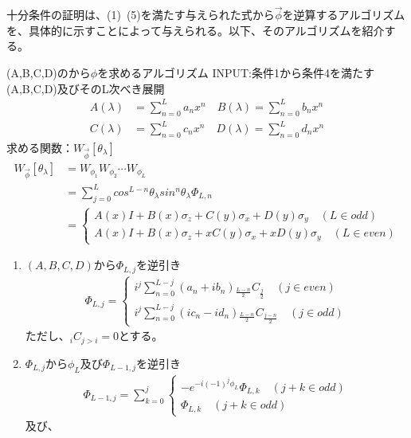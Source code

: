 \documentclass[a4paper,10.5pt]{article}
\numberwithin{equation}{section}
\begin{document}
十分条件の証明は、(1)~(5)を満たす与えられた式から$\vec{\phi}$を逆算するアルゴリズムを、具体的に示すことによって与えられる。以下、そのアルゴリズムを紹介する。
\begin{setupbox}{(A,B,C,D)のから$\phi$を求めるアルゴリズム}
INPUT:条件1から条件4を満たす(A,B,C,D)及びそのL次べき展開
\begin{align*}
    A(\lambda)&=\sum_{n=0}^{L}a_{n}x^{n}\quad
    B(\lambda)=\sum_{n=0}^{L}b_{n}x^{n}\\
    C(\lambda)&=\sum_{n=0}^{L}c_{n}x^{n} \quad
    D(\lambda)=\sum_{n=0}^{L}d_{n}x^{n}
\end{align*}
求める関数：$W_{\vec{\phi}}[\theta_{\lambda}]$
\begin{align*}
        W_{\vec{\phi}}[\theta_{\lambda}]
        &=W_{\phi_{1}}W_{\phi_{2}}\cdots W_{\phi_{L}}\\
        &=\sum_{j=0}^{L}cos^{L-n}\theta_{\lambda}sin^{n}\theta_{\lambda}\Phi_{L,n}\\
        &=\begin{cases}
            A(x)I+B(x)\sigma_{z}+C(y)\sigma_{x}+D(y)\sigma_{y}\quad(L\in odd)\\
            A(x)I+B(x)\sigma_{z}+xC(y)\sigma_{x}+xD(y)\sigma_{y}\quad (L\in even)
        \end{cases}
    \end{align*}
\begin{enumerate}
    \item $(A,B,C,D)$から$\Phi_{L,j}$を逆引き
        \begin{align*}
        \Phi_{L,j}=
        \begin{cases}
            i^{j}\sum_{n=0}^{L-j}(a_{n}+ib_{n}){}_{\frac{L-n}{2}}C_{\frac{j}{2}}\quad (j\in even)\\
            i^{j}\sum_{n=0}^{L-j}(ic_{n}-id_{n}){}_{\frac{L-n}{2}}C_{\frac{j-n}{2}}\quad (j\in odd)
        \end{cases}
        \end{align*}
        ただし、${}_{i}C_{j>i}=0$とする。
    \item $\Phi_{L,j}$から$\phi_{L}$及び$\Phi_{L-1,j}$を逆引き
    \begin{align*}
        \Phi_{L-1,j}=\sum_{k=0}^{j}\begin{cases}
            -e^{-i(-1)^{j}\phi_{L}}\Phi_{L,k}\quad (j+k\in odd)\\
            \Phi_{L,k}\quad (j+k\in odd)
        \end{cases}
    \end{align*}
    及び、

\end{enumerate}
\end{setupbox}
\end{document}
